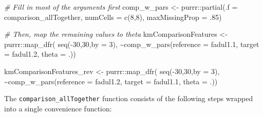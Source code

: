 \documentclass[11pt,]{isuthesis}
\newenvironment{Shaded}{\begin{snugshade}}{\end{snugshade}}
\newcommand{\AttributeTok}[1]{\textcolor[rgb]{0.77,0.63,0.00}{#1}}
\newcommand{\CommentTok}[1]{\textcolor[rgb]{0.56,0.35,0.01}{\textit{#1}}}
\newcommand{\DecValTok}[1]{\textcolor[rgb]{0.00,0.00,0.81}{#1}}
\newcommand{\FloatTok}[1]{\textcolor[rgb]{0.00,0.00,0.81}{#1}}
\newcommand{\FunctionTok}[1]{\textcolor[rgb]{0.00,0.00,0.00}{#1}}
\newcommand{\NormalTok}[1]{#1}
\newcommand{\OtherTok}[1]{\textcolor[rgb]{0.56,0.35,0.01}{#1}}
\newcommand{\SpecialCharTok}[1]{\textcolor[rgb]{0.00,0.00,0.00}{#1}}
\begin{document}
\begin{Shaded}
\begin{Highlighting}[]
\CommentTok{\# Fill in most of the arguments first}
\NormalTok{comp\_w\_pars }\OtherTok{\textless{}{-}}\NormalTok{ purrr}\SpecialCharTok{::}\FunctionTok{partial}\NormalTok{(}\AttributeTok{.f =}\NormalTok{ comparison\_allTogether,}
                              \AttributeTok{numCells =} \FunctionTok{c}\NormalTok{(}\DecValTok{8}\NormalTok{,}\DecValTok{8}\NormalTok{), }\AttributeTok{maxMissingProp =}\NormalTok{ .}\DecValTok{85}\NormalTok{)}

\CommentTok{\# Then, map the remaining values to theta}
\NormalTok{kmComparisonFeatures }\OtherTok{\textless{}{-}}\NormalTok{ purrr}\SpecialCharTok{::}\FunctionTok{map\_dfr}\NormalTok{(}
  \FunctionTok{seq}\NormalTok{(}\SpecialCharTok{{-}}\DecValTok{30}\NormalTok{,}\DecValTok{30}\NormalTok{,}\AttributeTok{by =} \DecValTok{3}\NormalTok{),}
  \SpecialCharTok{\textasciitilde{}}\FunctionTok{comp\_w\_pars}\NormalTok{(}\AttributeTok{reference =}\NormalTok{ fadul1}\FloatTok{.1}\NormalTok{, }\AttributeTok{target =}\NormalTok{ fadul1}\FloatTok{.2}\NormalTok{, }\AttributeTok{theta =}\NormalTok{ .))}

\NormalTok{kmComparisonFeatures\_rev }\OtherTok{\textless{}{-}}\NormalTok{ purrr}\SpecialCharTok{::}\FunctionTok{map\_dfr}\NormalTok{(}
  \FunctionTok{seq}\NormalTok{(}\SpecialCharTok{{-}}\DecValTok{30}\NormalTok{,}\DecValTok{30}\NormalTok{,}\AttributeTok{by =} \DecValTok{3}\NormalTok{),}
  \SpecialCharTok{\textasciitilde{}}\FunctionTok{comp\_w\_pars}\NormalTok{(}\AttributeTok{reference =}\NormalTok{ fadul1}\FloatTok{.2}\NormalTok{, }\AttributeTok{target =}\NormalTok{ fadul1}\FloatTok{.1}\NormalTok{, }\AttributeTok{theta =}\NormalTok{ .))}
\end{Highlighting}
\end{Shaded}

The \texttt{comparison\_allTogether} function consists of the following steps wrapped into a single convenience function:
\end{document}
